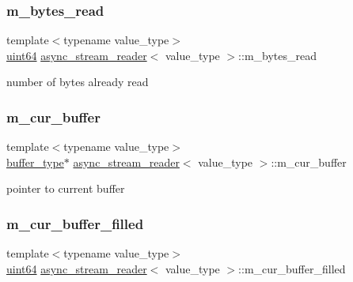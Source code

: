 \subsubsection{\texorpdfstring{m\+\_\+bytes\+\_\+read}{m\_bytes\_read}}
{\footnotesize\ttfamily template$<$typename value\+\_\+type$>$ \\
\hyperlink{types_8h_a60e8696a4678cd348e991a1f172e53f7}{uint64} \hyperlink{classasync__stream__reader}{async\+\_\+stream\+\_\+reader}$<$ value\+\_\+type $>$\+::m\+\_\+bytes\+\_\+read\hspace{0.3cm}{\ttfamily [private]}}



number of bytes already read 

\mbox{\label{classasync__stream__reader_a167103fd4cb153047682ec786d234f2f}} 
\subsubsection{\texorpdfstring{m\+\_\+cur\+\_\+buffer}{m\_cur\_buffer}}
{\footnotesize\ttfamily template$<$typename value\+\_\+type$>$ \\
\hyperlink{classasync__stream__reader_a48e2b7d24cfceba922a771e9c314b40c}{buffer\+\_\+type}$\ast$ \hyperlink{classasync__stream__reader}{async\+\_\+stream\+\_\+reader}$<$ value\+\_\+type $>$\+::m\+\_\+cur\+\_\+buffer\hspace{0.3cm}{\ttfamily [private]}}



pointer to current buffer 

\mbox{\label{classasync__stream__reader_a0414700ede611b3cbf26ef640c239709}} 
\subsubsection{\texorpdfstring{m\+\_\+cur\+\_\+buffer\+\_\+filled}{m\_cur\_buffer\_filled}}
{\footnotesize\ttfamily template$<$typename value\+\_\+type$>$ \\
\hyperlink{types_8h_a60e8696a4678cd348e991a1f172e53f7}{uint64} \hyperlink{classasync__stream__reader}{async\+\_\+stream\+\_\+reader}$<$ value\+\_\+type $>$\+::m\+\_\+cur\+\_\+buffer\+\_\+filled\hspace{0.3cm}{\ttfamily [private]}}



